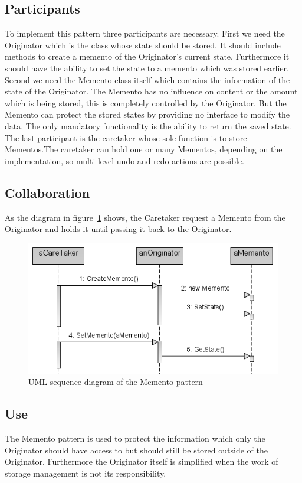 \documentclass{bioinfo}
\begin{document}
\subsection{Participants}
To implement this pattern three participants are necessary. First we need the Originator which is the class whose state should be stored. It should include methods to create a memento of the Originator's current state. Furthermore it should have the ability to set the state to a memento which was stored earlier.
Second we need the Memento class itself which contains the information of the state of the Originator. The Memento has no influence on content or the amount which is being stored, this is completely controlled by the Originator. But the Memento can protect the stored states by providing no interface to modify the data. The only mandatory functionality is the ability to return the saved state.
The last participant is the caretaker whose sole function is to store Mementos.The caretaker can hold one or many Mementos, depending on the implementation, so multi-level undo and redo actions are possible. \cite{gang4}
\subsection{Collaboration}
As the diagram in figure~\ref{fig:Memento_pattern_sequence} shows, the Caretaker request a Memento from the Originator and holds it until passing it back to the Originator.
\begin{figure}[ht]
    \centering
    \includegraphics[width=1\linewidth]{img/Memento_design_pattern_sequence1.png}
    \caption{UML sequence diagram of the Memento pattern \cite{memento_seq}}
    \label{fig:Memento_pattern_sequence}
\end{figure}
\subsection{Use}
The Memento pattern is used to protect the information which only the Originator should have access to but should still be stored outside of the Originator. Furthermore the Originator itself is simplified when the work of storage management is not its responsibility. \cite{gang4}  
\end{document}
